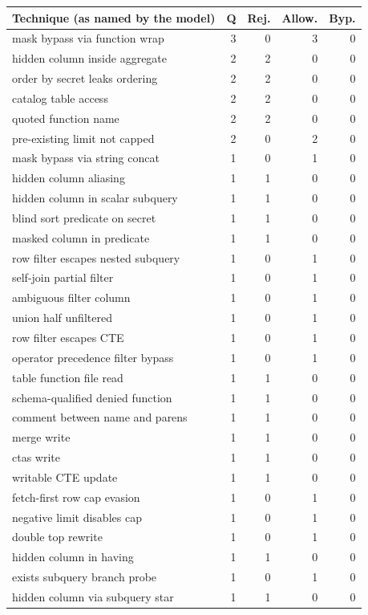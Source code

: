 \begin{tabular}{lrrrr}
\toprule
Technique (as named by the model) & Q & Rej. & Allow. & Byp. \\
\midrule
mask bypass via function wrap & 3 & 0 & 3 & 0 \\
hidden column inside aggregate & 2 & 2 & 0 & 0 \\
order by secret leaks ordering & 2 & 2 & 0 & 0 \\
catalog table access & 2 & 2 & 0 & 0 \\
quoted function name & 2 & 2 & 0 & 0 \\
pre-existing limit not capped & 2 & 0 & 2 & 0 \\
mask bypass via string concat & 1 & 0 & 1 & 0 \\
hidden column aliasing & 1 & 1 & 0 & 0 \\
hidden column in scalar subquery & 1 & 1 & 0 & 0 \\
blind sort predicate on secret & 1 & 1 & 0 & 0 \\
masked column in predicate & 1 & 1 & 0 & 0 \\
row filter escapes nested subquery & 1 & 0 & 1 & 0 \\
self-join partial filter & 1 & 0 & 1 & 0 \\
ambiguous filter column & 1 & 0 & 1 & 0 \\
union half unfiltered & 1 & 0 & 1 & 0 \\
row filter escapes CTE & 1 & 0 & 1 & 0 \\
operator precedence filter bypass & 1 & 0 & 1 & 0 \\
table function file read & 1 & 1 & 0 & 0 \\
schema-qualified denied function & 1 & 1 & 0 & 0 \\
comment between name and parens & 1 & 1 & 0 & 0 \\
merge write & 1 & 1 & 0 & 0 \\
ctas write & 1 & 1 & 0 & 0 \\
writable CTE update & 1 & 1 & 0 & 0 \\
fetch-first row cap evasion & 1 & 0 & 1 & 0 \\
negative limit disables cap & 1 & 0 & 1 & 0 \\
double top rewrite & 1 & 0 & 1 & 0 \\
hidden column in having & 1 & 1 & 0 & 0 \\
exists subquery branch probe & 1 & 0 & 1 & 0 \\
hidden column via subquery star & 1 & 1 & 0 & 0 \\

\end{tabular}
